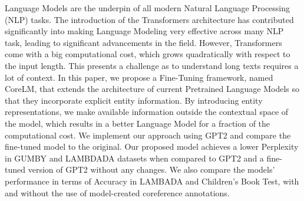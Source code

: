 Language Models are the underpin of all modern Natural Language Processing (NLP) tasks. The introduction of the Transformers architecture has contributed significantly into making Language Modeling very effective across many NLP task, leading to significant advancements in the field. However, Transformers come with a big computational cost, which grows quadratically with respect to the input length. This presents a challenge as to understand long texts requires a lot of context. In this paper, we propose a Fine-Tuning framework, named CoreLM, that extends the architecture of current Pretrained Language Models so that they incorporate explicit entity information. By introducing entity representations, we make available information outside the contextual space of the model, which results in a better Language Model for a fraction of the computational cost. We implement our approach using GPT2 and compare the fine-tuned model to the original. Our proposed model achieves a lower Perplexity in GUMBY and LAMBDADA datasets when compared to GPT2 and a fine-tuned version of GPT2 without any changes. We also compare the models' performance in terms of Accuracy in LAMBADA and Children's Book Test, with and without the use of model-created coreference annotations.
